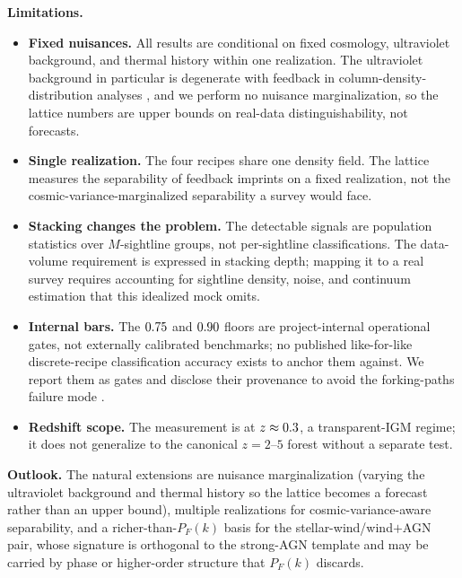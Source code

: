 \textbf{Limitations.}
\begin{itemize}
  \item \textbf{Fixed nuisances.} All results are conditional on fixed cosmology,
        ultraviolet background, and thermal history within one realization. The
        ultraviolet background in particular is degenerate with feedback in
        column-density-distribution analyses \citep{Christiansen2020,TillmanAJ2024},
        and we perform no nuisance marginalization, so the lattice numbers are
        upper bounds on real-data distinguishability, not forecasts.
  \item \textbf{Single realization.} The four recipes share one density field. The
        lattice measures the separability of feedback imprints on a fixed
        realization, not the cosmic-variance-marginalized separability a survey
        would face.
  \item \textbf{Stacking changes the problem.} The detectable signals are
        population statistics over $M$-sightline groups, not per-sightline
        classifications. The data-volume requirement is expressed in stacking
        depth; mapping it to a real survey requires accounting for sightline
        density, noise, and continuum estimation that this idealized mock omits.
  \item \textbf{Internal bars.} The $0.75$ and $0.90$ floors are
        project-internal operational gates, not externally calibrated benchmarks;
        no published like-for-like discrete-recipe classification accuracy exists
        to anchor them against. We report them as gates and disclose their
        provenance to avoid the forking-paths failure mode
        \citep{Simmons2011,GelmanLoken2014}.
  \item \textbf{Redshift scope.} The measurement is at $z\approx0.3$, a
        transparent-IGM regime; it does not generalize to the canonical
        $z=2$--$5$ forest without a separate test.
\end{itemize}

\textbf{Outlook.} The natural extensions are nuisance marginalization (varying the
ultraviolet background and thermal history so the lattice becomes a forecast
rather than an upper bound), multiple realizations for cosmic-variance-aware
separability, and a richer-than-$P_F(k)$ basis for the stellar-wind/wind${+}$AGN
pair, whose signature is orthogonal to the strong-AGN template and may be carried
by phase or higher-order structure that $P_F(k)$ discards.
